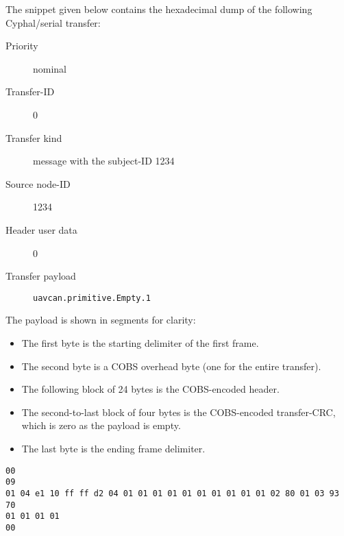 \begin{remark}
    The snippet given below contains the hexadecimal dump of the following Cyphal/serial transfer:

    \begin{description}
        \item[Priority] nominal
        \item[Transfer-ID] 0
        \item[Transfer kind] message with the subject-ID 1234
        \item[Source node-ID] 1234
        \item[Header user data] 0
        \item[Transfer payload] \verb|uavcan.primitive.Empty.1|
    \end{description}

    The payload is shown in segments for clarity:

    \begin{itemize}
        \item The first byte is the starting delimiter of the first frame.
        \item The second byte is a COBS overhead byte (one for the entire transfer).
        \item The following block of 24 bytes is the COBS-encoded header.
        \item The second-to-last block of four bytes is the COBS-encoded transfer-CRC,
        which is zero as the payload is empty.
        \item The last byte is the ending frame delimiter.
    \end{itemize}

    \begin{verbatim}
00
09
01 04 e1 10 ff ff d2 04 01 01 01 01 01 01 01 01 01 01 02 80 01 03 93 70
01 01 01 01
00
    \end{verbatim}
\end{remark}
